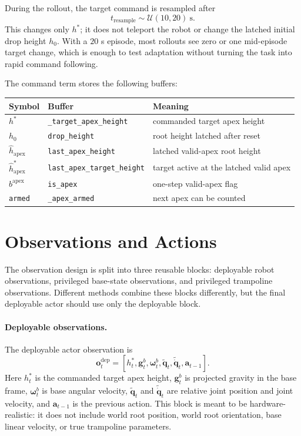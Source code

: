 \documentclass[11pt, a4paper]{article}
\begin{document}
During the rollout, the target command is resampled after
\begin{equation}
    t_{\mathrm{resample}} \sim \mathcal{U}(10,20)\ \mathrm{s}.
\end{equation}
This changes only $h^{*}$; it does not teleport the robot
or change the latched initial drop height $h_0$. With a $20$ s episode, most
rollouts see zero or one mid-episode target change, which is enough to test
adaptation without turning the task into rapid command following.

The command term stores the following buffers:
\begin{center}
\begin{tabular}{lll}
\hline
Symbol & Buffer & Meaning \\
\hline
$h^{*}$ & \texttt{\_target\_apex\_height} & commanded target apex height \\
$h_0$ & \texttt{drop\_height} & root height latched after reset \\
$\hat{h}_{\mathrm{apex}}$ & \texttt{last\_apex\_height} & latched valid-apex root height \\
$\hat{h}^{*}_{\mathrm{apex}}$ & \texttt{last\_apex\_target\_height} & target active at the latched valid apex \\
$b^{\mathrm{apex}}$ & \texttt{is\_apex} & one-step valid-apex flag \\
\texttt{armed} & \texttt{\_apex\_armed} & next apex can be counted \\
\hline
\end{tabular}
\end{center}


\section{Observations and Actions}

The observation design is split into three reusable blocks: deployable robot
observations, privileged base-state observations, and privileged trampoline
observations. Different methods combine these blocks differently, but the final
deployable actor should use only the deployable block.

\paragraph{Deployable observations.}
The deployable actor observation is
\begin{equation}
    \bm{o}^{\mathrm{dep}}_t =
    \left[
        h^{*}_t,
        \bm{g}^{b}_t,
        \bm{\omega}^{b}_t,
        \tilde{\bm{q}}_t,
        \tilde{\dot{\bm{q}}}_t,
        \bm{a}_{t-1}
    \right].
\end{equation}
Here $h^{*}_t$ is the commanded target apex height, $\bm{g}^{b}_t$ is projected
gravity in the base frame, $\bm{\omega}^{b}_t$ is base angular velocity,
$\tilde{\bm{q}}_t$ and $\tilde{\dot{\bm{q}}}_t$ are relative joint position and
joint velocity, and $\bm{a}_{t-1}$ is the previous action. This block is meant
to be hardware-realistic: it does not include world root position, world root
orientation, base linear velocity, or true trampoline parameters.
\end{document}
